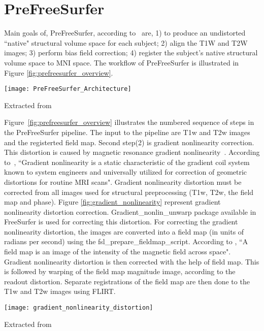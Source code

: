 \section{PreFreeSurfer} \label{sec:PrefreeSurfer}
Main goals of, PreFreeSurfer, according to~\cite{Gla13} are, 1) to produce an undistorted ``native" structural volume space for each subject; 2) align the T1W and T2W images; 3) perform bias field correction; 4) register the subject's native structural volume space to MNI space. The workflow of PreFreeSurfer is illustrated in Figure \ref{fig:prefreesurfer_overview}.

\begin{center}
  \texttt{[image: PreFreeSurfer\_Architecture]}
  \label{fig:prefreesurfer_overview}
  \caption*{Extracted from \cite{Gla13}}
\end{center}

Figure~\ref{fig:prefreesurfer_overview} illustrates the numbered sequence of steps in the PreFreeSurfer pipeline. The input to the pipeline are T1w and T2w images and the registerted field map. Second step(2) is gradient nonlinearity correction. This distortion is caused by magnetic resonance gradient nonlinearity~\cite{Gla13}. According to~\cite{Zou2004}, ``Gradient nonlinearity is a static characteristic of the gradient coil system known to system engineers and universally utilized for correction of geometric distortions for routine MRI scans". Gradient nonlinearity distortion must be corrected from all images used for structural preprocessing (T1w, T2w, the field map and phase). Figure \ref{fig:gradient_nonlinearity} represent gradient nonlinearity distortion correction. Gradient\_nonlin\_unwarp package available in FreeSurfer is used for correcting this distortion. For correcting the gradient nonlinearity distortion, the images are converted into a field map (in units of radians per second) using the fsl\_prepare\_fieldmap\_script. According to \cite{field_map}, ``A field map is an image of the intensity of the magnetic field across space". Gradient nonlinearity distortion is then corrected with the help of field map. This is followed by warping of the field map magnitude image, according to the readout distortion. Separate registrations of the field map are then done to the T1w and T2w images using FLIRT.

\begin{center}
  \texttt{[image: gradient\_nonlinearity\_distortion]}
  \label{fig:gradient_nonlinearity}
  \caption*{Extracted from \cite{Gla13}}
\end{center}

